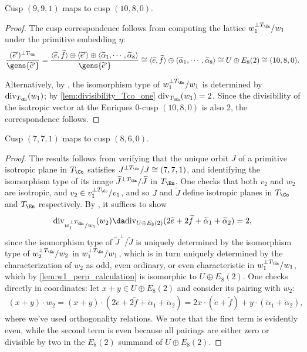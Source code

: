 \documentclass[../main.tex]{subfiles}
\begin{document}
\begin{lemma}\label{lem:w1_perp_calculation}
Cusp $(9,9,1)$ maps to cusp $(10, 8, 0)$.
\end{lemma}

\begin{proof}
The cusp correspondence follows from computing the lattice $w_1^{\perp T_{\En}}/w_1$ under the primitive embedding $\eta$:
\[
{(\tilde e')^{\perp T_\En} \over \gens{\tilde e'}} =
{ 
\langle\tilde{e}, \tilde{f}\rangle
\oplus
\left\langle\tilde{e}^{\prime}\right\rangle
\oplus
\left\langle\tilde{\alpha}_{1}, \cdots, \tilde{\alpha}_{8} \right\rangle
\over 
\gens{ \tilde{e}^{\prime} }}\cong\langle\tilde{e}, \tilde{f}\rangle \oplus\left\langle
\tilde{\alpha}_{1},\cdots, \tilde{\alpha}_{8}
\right\rangle \cong U \oplus E_{8}(2) \cong (10,8,0)
.\]

Alternatively, by \cite[Prop. 5.5]{AE22}, the isomorphism type of $w_1^{\perp T_{\En}}/w_1$ is determined by $\mathrm{div}_{T_\En}(w_1)$; by \cref{lem:divisibility_Tco_one} $\mathrm{div}_{T_\En}(w_1) = 2$. Since the divisibility of the isotropic vector at the Enriques 0-cusp $(10, 8, 0)$ is also 2, the correspondence follows.
\end{proof}

\begin{lemma}\label{lem:1_cusp_correspondence}
Cusp $(7,7,1)$ maps to cusp $(8, 6, 0)$.
\end{lemma}

\begin{proof}

The results follows from verifying that the unique orbit $J$ of a primitive isotropic plane in $T_\Co$ satisfies $J^{\perp T_\Co}/J \cong (7,7,1)$, and identifying the isomorphism type of its image $\tilde J^{\perp T_\En}/\tilde J$ in $T_\En$.
One checks that both $v_2$ and $w_2$ are isotropic, and $v_2 \in v_1^{\perp T_\Co}/v_1$, and so $J$ and $\tilde J$ define isotropic planes in $T_\Co$ and $T_\En$ respectively. By \cite[Prop. 5.5, Lem. 5.9]{AE22}, it suffices to show
\[
\mathrm{div}_{w_1^{\perp T_\En} /w_1}(w_2)  \da \mathrm{div}_{U \oplus E_8(2)}(2\tilde e + 2\tilde f + \tilde \alpha_1 + \tilde \alpha_2)= 2
,\]
since the isomorphism type of $\tilde J^\perp/\tilde J$ is uniquely determined by the isomorphism type of $w_2^{\perp T_\En}/w_2$ in $w_1^{\perp T_\En}/w_1$, which is in turn uniquely determined by the characterization of $w_2$ as odd, even ordinary, or even characteristic in $w_1^{\perp T_\En}/w_1$, which by \cref{lem:w1_perp_calculation} is isomorphic to $U \oplus E_8(2)$. One checks directly in coordinates: let $x+y\in U \oplus E_8(2)$ and consider its pairing with $w_2$:
\begin{align*}
(x+y)\cdot w_2 
= (x+y)\cdot (2\tilde e + 2\tilde f + \tilde \alpha_1 + \tilde \alpha_2 )
= 2x\cdot (\tilde e + \tilde f) + y\cdot (\tilde \alpha_1 + \tilde \alpha_2)
,\end{align*}
where we've used orthogonality relations. We note that the first term is evidently even, while the second term is even because all pairings are either zero or divisible by two in the $E_8(2)$ summand of $U \oplus E_8(2)$.
\end{proof}
\end{document}
